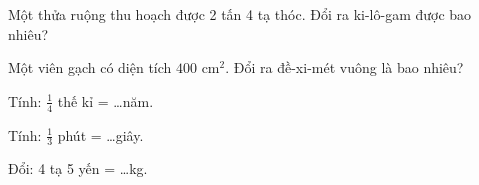 \begin{ex}
Một thửa ruộng thu hoạch được 2 tấn 4 tạ thóc. Đổi ra ki-lô-gam được bao nhiêu?
\end{ex}

\begin{ex}
Một viên gạch có diện tích $400\text{ cm}^2$. Đổi ra đề-xi-mét vuông là bao nhiêu?
\end{ex}

\begin{ex}
Tính: $\frac{1}{4}$ thế kỉ = \dots năm.
\end{ex}

\begin{ex}
Tính: $\frac{1}{3}$ phút = \dots giây.
\end{ex}

\begin{ex}
Đổi: 4 tạ 5 yến = \dots kg.
\end{ex}
